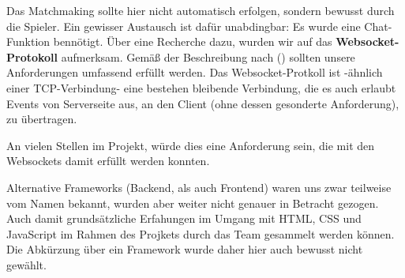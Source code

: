 Das \gls{Matchmaking} sollte hier nicht automatisch erfolgen, sondern bewusst durch die Spieler. Ein gewisser Austausch ist dafür unabdingbar: Es wurde eine Chat-Funktion bennötigt. Über eine Recherche dazu, wurden wir auf das \textbf{Websocket-Protokoll} aufmerksam. Gemäß der Beschreibung nach \citeauthor{heise-django-2011} (\citeyear{heise-django-2011}) sollten unsere Anforderungen umfassend erfüllt werden. Das Websocket-Protkoll ist -ähnlich einer TCP-Verbindung- eine bestehen bleibende Verbindung, die es auch erlaubt Events von Serverseite aus, an den Client (ohne dessen gesonderte Anforderung), zu übertragen. 

An vielen Stellen im Projekt, würde dies eine Anforderung sein, die mit den Websockets damit erfüllt werden konnten. 

Alternative Frameworks (Backend, als auch Frontend) waren uns zwar teilweise vom Namen bekannt, wurden aber weiter nicht genauer in Betracht gezogen. Auch damit grundsätzliche Erfahungen im Umgang mit HTML, CSS und JavaScript im Rahmen des Projkets durch das Team gesammelt werden können. Die Abkürzung über ein Framework wurde daher hier auch bewusst nicht gewählt. 

